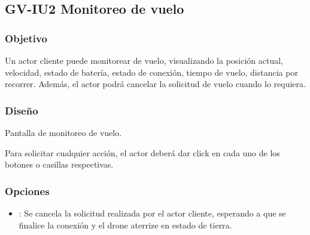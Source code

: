 %

\subsection{GV-IU2 Monitoreo de vuelo}

\subsubsection{Objetivo}
	Un actor cliente puede monitorear de vuelo, visualizando la posición 
actual, velocidad, estado de batería, estado de conexión, tiempo de vuelo, 
distancia por recorrer. Además, el actor podrá cancelar la solicitud de vuelo 
cuando lo requiera.

\subsubsection{Diseño}

{Pantalla de monitoreo de vuelo.} 

	Para solicitar cualquier acción, el actor deberá dar click en cada uno 
de los botones o casillas respectivas.

\subsubsection{Opciones}
\begin{itemize}
	\item {}: Se cancela la solicitud 
	realizada por el actor cliente, esperando a que se finalice la conexión y el 
	drone aterrize en estado de tierra.
\end{itemize}
